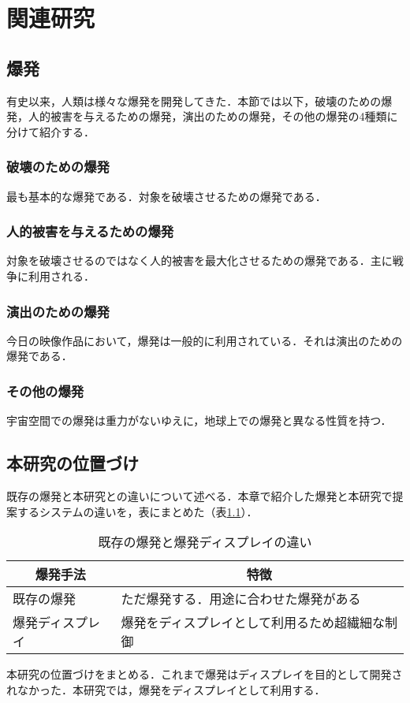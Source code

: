 \chapter{関連研究}
\label{chap:relatedworks}

\section{爆発}

有史以来，人類は様々な爆発を開発してきた．本節では以下，破壊のための爆発，人的被害を与えるための爆発，演出のための爆発，その他の爆発の4種類に分けて紹介する．

\subsection{破壊のための爆発}

最も基本的な爆発である．対象を破壊させるための爆発である．

\subsection{人的被害を与えるための爆発}

対象を破壊させるのではなく人的被害を最大化させるための爆発である．主に戦争に利用される．

\subsection{演出のための爆発}

今日の映像作品において，爆発は一般的に利用されている．それは演出のための爆発である．

\subsection{その他の爆発}

宇宙空間での爆発は重力がないゆえに，地球上での爆発と異なる性質を持つ．

\section{本研究の位置づけ}

既存の爆発と本研究との違いについて述べる．本章で紹介した爆発と本研究で提案するシステムの違いを，表にまとめた（表\ref{explosionDiff}）．

\begin{table}[H]
	\caption{既存の爆発と爆発ディスプレイの違い}
	\label{explosionDiff}
	\begin{center}
	\setlength{\tabcolsep}{6pt}
	\footnotesize
	\begin{tabular}{ll} \toprule
		\multicolumn{1}{c}{爆発手法} & \multicolumn{1}{c}{特徴} \\ \midrule
		既存の爆発 & ただ爆発する．用途に合わせた爆発がある \\
		爆発ディスプレイ & 爆発をディスプレイとして利用るため超繊細な制御 \\ \bottomrule
	\end{tabular}
	\end{center}
\end{table}

本研究の位置づけをまとめる．これまで爆発はディスプレイを目的として開発されなかった．本研究では，爆発をディスプレイとして利用する．